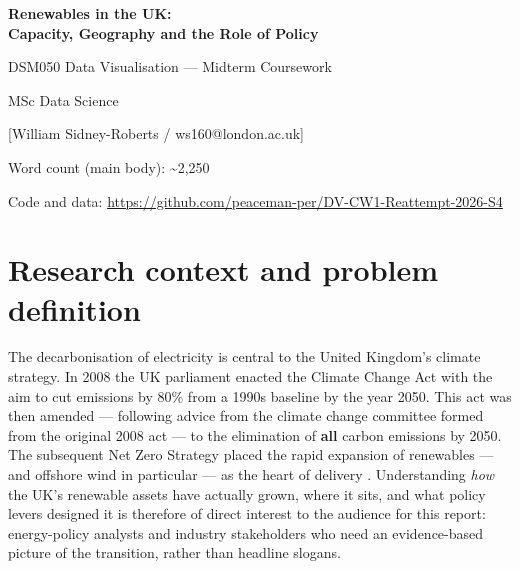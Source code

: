 \documentclass[11pt]{article}
\begin{document}
\begin{titlepage}
\centering
\vspace*{3cm}
{\LARGE\bfseries Renewables in the UK:\\[2mm] Capacity, Geography and the Role of Policy\par}
\vspace{1.5cm}
{\large DSM050 Data Visualisation --- Midterm Coursework\par}
\vspace{0.5cm}
{\large MSc Data Science\par}
\vspace{2cm}
{\large [William Sidney-Roberts / ws160@london.ac.uk]\par}
\vspace{2cm}
{\normalsize Word count (main body): \textasciitilde2{,}250\par}
{\normalsize Code and data: \url{https://github.com/peaceman-per/DV-CW1-Reattempt-2026-S4}\par}
\vfill
\end{titlepage}

\section{Research context and problem definition}

The decarbonisation of electricity is central to the United Kingdom's climate strategy. In 2008 the UK parliament enacted the Climate Change Act with the aim to cut emissions by 80\% from a 1990s baseline by the year 2050. This act was then amended --- following advice from the climate change committee formed from the original 2008 act \citep{ccc2019} --- to the elimination of \textbf{all} carbon emissions by 2050. The subsequent Net Zero Strategy placed the rapid expansion of renewables --- and offshore wind in particular --- as the heart of delivery \citep{netzero2021}. Understanding \emph{how} the UK's renewable assets have actually grown, where it sits, and what policy levers designed it is therefore of direct interest to the audience for this report: energy-policy analysts and industry stakeholders who need an evidence-based picture of the transition, rather than headline slogans.
\end{document}
